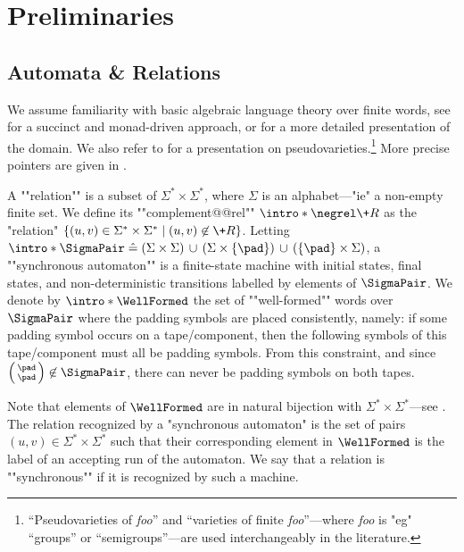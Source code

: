 \section{Preliminaries}
\label{sec:preliminaries}

\subsection{Automata \& Relations}

We assume familiarity with basic algebraic language theory over finite words, see \cite[\S 1, 2, 4, pp.~3--66 \& pp.~107--156]{bojanczyk_languages_2020} for a succinct and monad-driven approach, or \cite[\S I--XIV, pp.~3--247]{pin_mathematical_2022} for a more detailed presentation of the domain.
We also refer to \cite{SW21varieties} for a presentation on pseudovarieties.\footnote{``Pseudovarieties of \emph{foo}'' and ``varieties of finite \emph{foo}''---where \emph{foo} is "eg" ``groups''
or ``semigroups''---are used interchangeably in the literature.}
More precise pointers are given in .

A \AP""relation"" is a subset of $\Sigma^*\times\Sigma^*$,
where $\Sigma$ is an alphabet---"ie" a non-empty finite set.
We define its \AP""complement@@rel"" \AP$\intro*\negrel \+R$ as the "relation" $\{(u,v) \in \Sigma^*\times \Sigma^* \mid (u,v) \not\in \+R\}$.
Letting
$\intro*\SigmaPair \defeq
(\Sigma \times \Sigma) \,\cup\,
(\Sigma \times \{\pad\}) \,\cup\,
(\{\pad\} \times \Sigma)$, a ""synchronous automaton"" is a finite-state machine with initial states, final states, and
non-deterministic transitions labelled by elements of $\SigmaPair$.
We denote by \AP$\intro*\WellFormed$ the set of \AP""well-formed"" words over $\SigmaPair$ where the padding symbols are placed consistently, namely: if some padding symbol occurs on a tape/component, then the following symbols of this tape/component must all be padding symbols.
From this constraint, and since $\pair{\pad}{\pad} \not\in \SigmaPair$,
there can never be padding symbols on both tapes.

Note that elements of $\WellFormed$ are in natural bijection with $\Sigma^*\times\Sigma^*$---see
.
The relation recognized by a "synchronous automaton" is the set of pairs $(u,v) \in \Sigma^*\times\Sigma^*$ such that their corresponding element in $\WellFormed$ is the label of
an accepting run of the automaton. We say that a relation is \AP""synchronous"" if it is recognized 
by such a machine.

